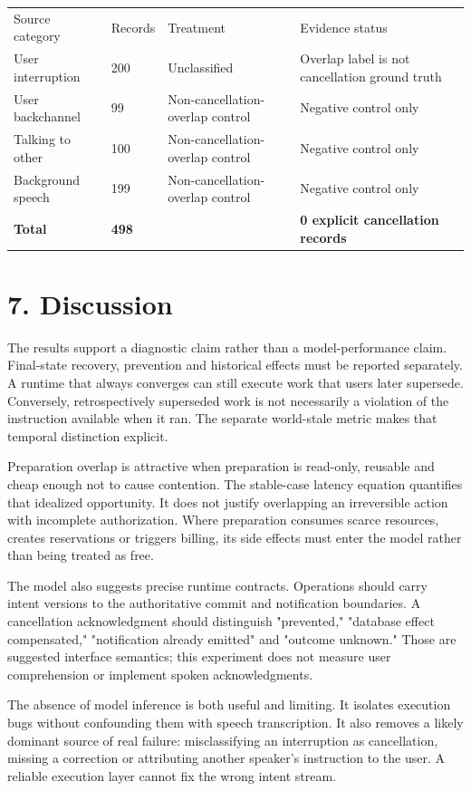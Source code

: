 \documentclass[10pt]{article}
\begin{document}
{\scriptsize
\begin{tabularx}{\textwidth}{XXXX}
\hline
Source category & Records & Treatment & Evidence status \\
User interruption & 200 & Unclassified & Overlap label is not cancellation ground truth \\
User backchannel & 99 & Non-cancellation-overlap control & Negative control only \\
Talking to other & 100 & Non-cancellation-overlap control & Negative control only \\
Background speech & 199 & Non-cancellation-overlap control & Negative control only \\
\textbf{Total} & \textbf{498} &  & \textbf{0 explicit cancellation records} \\
\hline
\end{tabularx}
}


\section*{7. Discussion}

The results support a diagnostic claim rather than a model-performance claim. Final-state recovery, prevention and historical effects must be reported separately. A runtime that always converges can still execute work that users later supersede. Conversely, retrospectively superseded work is not necessarily a violation of the instruction available when it ran. The separate world-stale metric makes that temporal distinction explicit.


Preparation overlap is attractive when preparation is read-only, reusable and cheap enough not to cause contention. The stable-case latency equation quantifies that idealized opportunity. It does not justify overlapping an irreversible action with incomplete authorization. Where preparation consumes scarce resources, creates reservations or triggers billing, its side effects must enter the model rather than being treated as free.


The model also suggests precise runtime contracts. Operations should carry intent versions to the authoritative commit and notification boundaries. A cancellation acknowledgment should distinguish "prevented," "database effect compensated," "notification already emitted" and "outcome unknown." Those are suggested interface semantics; this experiment does not measure user comprehension or implement spoken acknowledgments.


The absence of model inference is both useful and limiting. It isolates execution bugs without confounding them with speech transcription. It also removes a likely dominant source of real failure: misclassifying an interruption as cancellation, missing a correction or attributing another speaker's instruction to the user. A reliable execution layer cannot fix the wrong intent stream.
\end{document}

